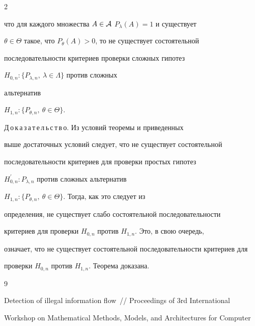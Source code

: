 \begin{multicols}{2}
{что для каждого множества $A\in\cal{A}$ $P_\lambda (A)=1$  и существует 


$\theta\in\Theta$ такое, что $P_\theta (A)>0$, то не существует состоятельной 


последовательности критериев проверки сложных гипотез 


$H_{0,n}:\{P_{\lambda,n},\ \lambda \in\Lambda\}$  против сложных 


альтернатив} $H_{1,n}:\{P_{\theta,n},\ \theta\in\Theta\}$.


    \smallskip


    


    \noindent


    Д\,о\,к\,а\,з\,а\,т\,е\,л\,ь\,с\,т\,в\,о. Из условий теоремы и приведенных 


выше достаточных условий следует, что не существует состоятельной 


последовательности критериев для проверки простых гипотез 


$H^\prime_{0,n}:P_{\lambda,n}$ против сложных альтернатив 


$H_{1,n}:\{P_{\theta,n},\ \theta\in\Theta\}$. Тогда, как это следует из 


определения, не существует слабо состоятельной последовательности 


критериев для проверки $H_{0,n}$ против $H_{1,n}$. Это, в свою очередь, 


означает, что не существует состоятельной последовательности критериев для 


проверки $H_{0,n}$ против $H_{1,n}$. Теорема доказана. 


    


    


{\small\frenchspacing


{%




\begin{thebibliography}{9}    









Detection of illegal information flow~// Proceedings of 3rd International 


Workshop on Mathematical Methods, Models, and Architectures for Computer 



\end{thebibliography}}}
\end{multicols}
